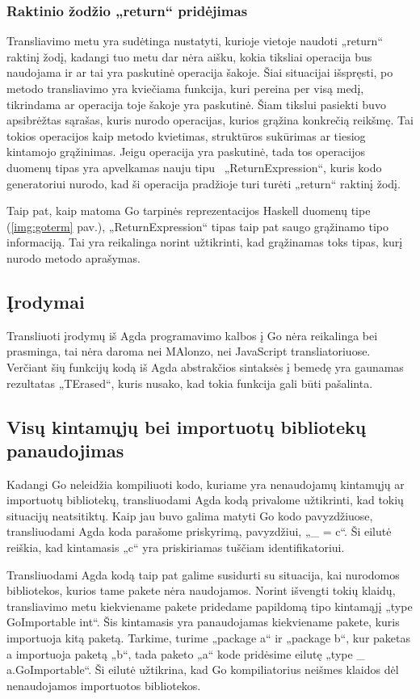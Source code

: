 \documentclass{VUMIFPSbakalaurinis}
\begin{document}
\subsubsection{Raktinio žodžio „return“ pridėjimas}
Transliavimo metu yra sudėtinga nustatyti, kurioje vietoje naudoti „return“ raktinį žodį, kadangi tuo metu dar nėra aišku, kokia tiksliai operacija bus naudojama ir ar tai yra paskutinė operacija šakoje. Šiai situacijai išspręsti, po metodo transliavimo yra kviečiama funkcija, kuri pereina per visą medį, tikrindama ar operacija toje šakoje yra paskutinė. Šiam tikslui pasiekti buvo apsibrėžtas sąrašas, kuris nurodo operacijas, kurios grąžina konkrečią reikšmę. Tai tokios operacijos kaip metodo kvietimas, struktūros sukūrimas ar tiesiog kintamojo grąžinimas. Jeigu operacija yra paskutinė, tada tos operacijos duomenų tipas yra apvelkamas nauju tipu \mbox{ „ReturnExpression“}, kuris kodo generatoriui nurodo, kad ši operacija pradžioje turi turėti „return“ raktinį žodį. \par Taip pat, kaip matoma Go tarpinės reprezentacijos Haskell duomenų tipe (\ref{img:goterm} pav.), \mbox{„ReturnExpression“} tipas taip pat saugo grąžinamo tipo informaciją. Tai yra reikalinga norint užtikrinti, kad grąžinamas toks tipas, kurį nurodo metodo aprašymas.
\subsection{Įrodymai}
Transliuoti įrodymų iš Agda programavimo kalbos į Go nėra reikalinga bei prasminga, tai nėra daroma nei MAlonzo, nei JavaScript transliatoriuose. Verčiant šių funkcijų kodą iš Agda abstrakčios sintaksės į bemedę yra gaunamas rezultatas „TErased“, kuris nusako, kad tokia funkcija gali būti pašalinta.
\subsection{Visų kintamųjų bei importuotų bibliotekų panaudojimas}
Kadangi Go neleidžia kompiliuoti kodo, kuriame yra nenaudojamų kintamųjų ar importuotų bibliotekų, transliuodami Agda kodą privalome užtikrinti, kad tokių situacijų neatsitiktų. Kaip jau buvo galima matyti Go kodo pavyzdžiuose, transliuodami Agda koda parašome priskyrimą, pavyzdžiui, „\_ = c“. Ši eilutė reiškia, kad kintamasis „c“ yra priskiriamas tuščiam identifikatoriui.\par Transliuodami Agda kodą taip pat galime susidurti su situacija, kai nurodomos bibliotekos, kurios tame pakete nėra naudojamos. Norint išvengti tokių klaidų, transliavimo metu kiekviename pakete pridedame papildomą tipo kintamąjį „type GoImportable int“. Šis kintamasis yra panaudojamas kiekviename pakete, kuris importuoja kitą paketą. Tarkime, turime „package a“ ir „package b“, kur paketas a importuoja paketą „b“, tada paketo „a“ kode pridėsime eilutę „type \_ a.GoImportable“. Ši eilutė užtikrina, kad Go kompiliatorius neišmes klaidos dėl nenaudojamos importuotos bibliotekos.
\end{document}
